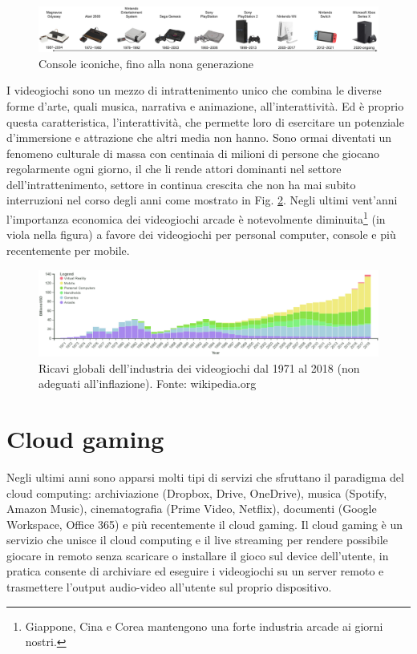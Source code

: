 \begin{figure}[H]
	\includegraphics[width=\linewidth]{immagini/consoles_history}
	\caption{Console iconiche, fino alla nona generazione}
	\label{fig:consoles_history}
\end{figure}

I videogiochi sono un mezzo di intrattenimento unico che combina le diverse forme d'arte, quali musica, narrativa e animazione, all'interattività. Ed è proprio questa caratteristica, l'interattività, che permette loro di esercitare un potenziale d'immersione e attrazione che altri media non hanno. Sono ormai diventati un fenomeno culturale di massa con centinaia di milioni di persone che giocano regolarmente ogni giorno, il che li rende attori dominanti nel settore dell'intrattenimento, settore in continua crescita che non ha mai subito interruzioni nel corso degli anni come mostrato in Fig. \ref{fig:valore_commerciale_giochi_globale}. Negli ultimi vent'anni l'importanza economica dei videogiochi arcade è notevolmente diminuita\footnote{Giappone, Cina e Corea mantengono una forte industria arcade ai giorni nostri.} (in viola nella figura) a favore dei videogiochi per personal computer, console e più recentemente per mobile.

\begin{figure}[H]
	\includegraphics[width=\linewidth]{immagini/valore_commerciale_giochi_globale.png}
	\caption{Ricavi globali dell'industria dei videogiochi dal 1971 al 2018 (non adeguati all'inflazione). Fonte: wikipedia.org}
	\label{fig:valore_commerciale_giochi_globale}
\end{figure}



\section{Cloud gaming}
Negli ultimi anni sono apparsi molti tipi di servizi che sfruttano il paradigma del cloud computing: archiviazione (Dropbox, Drive, OneDrive), musica (Spotify, Amazon Music), cinematografia (Prime Video, Netflix), documenti (Google Workspace, Office 365) e più recentemente il cloud gaming. Il cloud gaming è un servizio che unisce il cloud computing e il live streaming per rendere possibile giocare in remoto senza scaricare o installare il gioco sul device dell'utente, in pratica consente di archiviare ed eseguire i videogiochi su un server remoto e trasmettere l'output audio-video all'utente sul proprio dispositivo.

